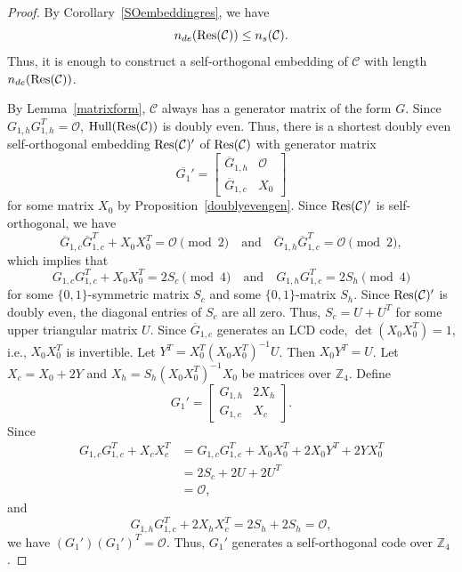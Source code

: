\documentclass{article}
\theoremstyle{definition}
\theoremstyle{remark}
\begin{document}
\begin{proof}
    By Corollary~\ref{SOembeddingres}, we have
    \[
        n_{de}({\rm Res}(\mathcal C))\le n_s(\mathcal C).
    \]
    Thus, it is enough to construct a self-orthogonal embedding of $\mathcal C$ with length $n_{de}({\rm Res}(\mathcal C))$.



    By Lemma~\ref{matrixform}, $\mathcal{C}$ always has a generator matrix of the form $G$. Since $G_{1, h}G_{1, h}^T=\mathcal{O}$, ${\rm{Hull}}({\rm Res}(\mathcal{C}))$ is doubly even. Thus, there is a shortest doubly even self-orthogonal embedding ${\rm{Res}}(\mathcal{C})'$ of ${\rm{Res}}(\mathcal{C})$ with generator matrix
    \[
    \overline{G_1}'=\begin{bmatrix}
        \overline{G}_{1, h} & \mathcal{O}\\\overline{G}_{1, c} & X_0
    \end{bmatrix}
    \]
    for some matrix $X_0$ by Proposition~\ref{doublyevengen}. Since ${\rm{Res}}(\mathcal{C})'$ is self-orthogonal, we have
    \[
    \overline{G}_{1, c}\overline{G}_{1, c}^T+X_0X_0^T=\mathcal{O}\pmod 2\quad\mbox{and}\quad\overline{G}_{1, h}\overline{G}_{1, c}^T=\mathcal{O}\pmod 2,
    \]
    which implies that
    \[
    G_{1, c}G_{1, c}^T+X_0X_0^T=2S_c\pmod 4\quad\mbox{and}\quad G_{1, h}G_{1, c}^T=2S_h\pmod 4
    \]
    for some $\{0, 1\}$-symmetric matrix $S_c$ and some $\{0, 1\}$-matrix $S_h$. Since ${\rm{Res}}(\mathcal{C})'$ is doubly even, the diagonal entries of $S_c$ are all zero. Thus, $S_c=U+U^T$ for some upper triangular matrix $U$. Since $\overline{G}_{1, c}$ generates an LCD code, $\det(X_0X_0^T)=1$, i.e., $X_0X_0^T$ is invertible. Let $Y^T=X_0^T(X_0X_0^T)^{-1}U$. Then $X_0Y^T=U$. Let $X_c=X_0+2Y$ and $X_h=S_h(X_0X_0^T)^{-1}X_0$ be matrices over $\mathbb{Z}_4$. Define
    \[
    G_1'=\begin{bmatrix}
        G_{1, h} & 2X_h\\G_{1, c} & X_c
    \end{bmatrix}.
    \]
    Since
    \begin{align*}
    G_{1, c}G_{1, c}^T+X_cX_c^T&=G_{1, c}G_{1, c}^T+X_0X_0^T+2X_0Y^T+2YX_0^T\\&=2S_c+2U+2U^T\\&=\mathcal{O},
    \end{align*}
    and
    \[
    G_{1, h}G_{1, c}^T+2X_hX_c^T=2S_h+2S_h=\mathcal{O},
    \]
    we have $(G_1')(G_1')^T=\mathcal{O}$. Thus, $G_1'$ generates a self-orthogonal code over $\mathbb{Z}_4$. 
    

\end{proof}
\end{document}
